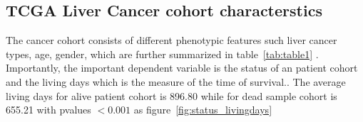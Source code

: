 \documentclass[11pt]{article}
\begin{document}
 	
	
	\subsection {TCGA Liver Cancer cohort characterstics}
 
The cancer cohort consists of different phenotypic features such liver cancer types, age, gender, which are further summarized in table~\ref{tab:table1} . Importantly, the important dependent variable is the status of an patient cohort  and the  living days which is the measure of the time of survival.. The average living days for alive  patient cohort is  896.80 while for dead sample cohort is 655.21 with pvalues $< 0.001$ as figure~\ref{fig:status_livingdays}
 
 \begin{table}[h]
\centering
{}
\end{table}
\end{document}
